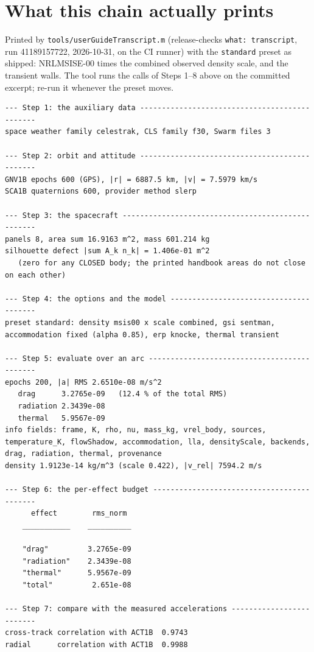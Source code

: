 \documentclass[11pt,a4paper]{report}
\begin{document}
\section{What this chain actually prints}
\noindent Printed by \texttt{tools/userGuideTranscript.m} (release-checks \texttt{what: transcript}, run
41189157722, 2026-10-31, on the CI runner) with the \texttt{standard} preset as shipped: NRLMSISE-00
times the combined observed density scale, and the transient walls. The tool runs the calls of Steps
1--8 above on the committed excerpt; re-run it whenever the preset moves.
\begin{lstlisting}
--- Step 1: the auxiliary data ----------------------------------------------
space weather family celestrak, CLS family f30, Swarm files 3

--- Step 2: orbit and attitude ----------------------------------------------
GNV1B epochs 600 (GPS), |r| = 6887.5 km, |v| = 7.5979 km/s
SCA1B quaternions 600, provider method slerp

--- Step 3: the spacecraft --------------------------------------------------
panels 8, area sum 16.9163 m^2, mass 601.214 kg
silhouette defect |sum A_k n_k| = 1.406e-01 m^2
   (zero for any CLOSED body; the printed handbook areas do not close on each other)

--- Step 4: the options and the model ---------------------------------------
preset standard: density msis00 x scale combined, gsi sentman, accommodation fixed (alpha 0.85), erp knocke, thermal transient

--- Step 5: evaluate over an arc --------------------------------------------
epochs 200, |a| RMS 2.6510e-08 m/s^2
   drag      3.2765e-09   (12.4 % of the total RMS)
   radiation 2.3439e-08
   thermal   5.9567e-09
info fields: frame, K, rho, nu, mass_kg, vrel_body, sources, temperature_K, flowShadow, accommodation, lla, densityScale, backends, drag, radiation, thermal, provenance
density 1.9123e-14 kg/m^3 (scale 0.422), |v_rel| 7594.2 m/s

--- Step 6: the per-effect budget -------------------------------------------
      effect        rms_norm
    ___________    __________

    "drag"         3.2765e-09
    "radiation"    2.3439e-08
    "thermal"      5.9567e-09
    "total"         2.651e-08

--- Step 7: compare with the measured accelerations -------------------------
cross-track correlation with ACT1B  0.9743
radial      correlation with ACT1B  0.9988


\end{lstlisting}
\end{document}
